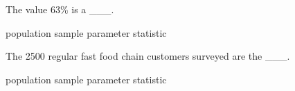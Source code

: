 \documentclass{article}
\begin{document}
\begin{mcquestions}
	
	\question The value 63\% is a \_\_\_.
	
	\begin{mcanswerslist}
		\answer population
		\answer sample
		\answer parameter
		\answer[correct] statistic
	\end{mcanswerslist}
	
	\question[follow] The 2500 regular fast food chain customers surveyed are the \_\_\_.
	
	\begin{mcanswerslist}
		\answer population
		\answer[correct] sample
		\answer parameter
		\answer statistic
	\end{mcanswerslist}
	
	
		
	\end{mcquestions}
\end{document}
